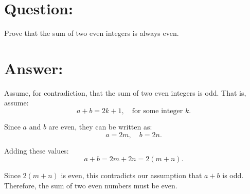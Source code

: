 \documentclass{article}
\begin{document}
\section{Question:}

Prove that the sum of two even integers is always even.

\section{Answer:}

Assume, for contradiction, that the sum of two even integers is odd. That is, assume:
\begin{equation}
    a + b = 2k + 1, \quad \text{for some integer } k.
\end{equation}

Since $a$ and $b$ are even, they can be written as:
\begin{equation}
    a = 2m, \quad b = 2n.
\end{equation}

Adding these values:
\begin{equation}
    a + b = 2m + 2n = 2(m+n).
\end{equation}

Since $2(m+n)$ is even, this contradicts our assumption that $a + b$ is odd. Therefore, the sum of two even numbers must be even.
\end{document}
